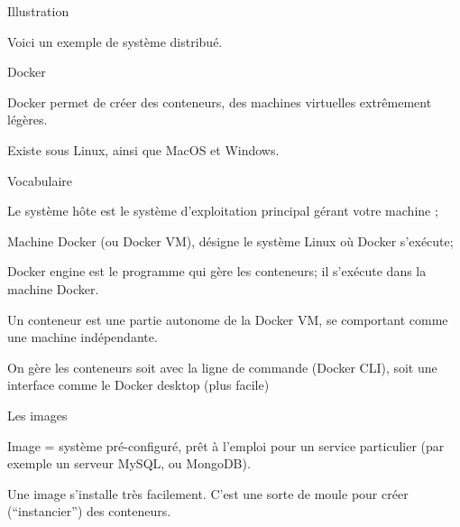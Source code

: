 \begin{frame}{Illustration}

Voici un exemple de système distribué.

\vfill


\end{frame}

\begin{frame}{Docker}

Docker permet de créer des \alert{conteneurs}, des machines virtuelles extrêmement légères.
\vfill


\vfill

Existe sous Linux, ainsi que MacOS et Windows.
\end{frame}


\begin{frame}{Vocabulaire}

\begin{redbullet}
  \item Le \alert{système hôte} est le système d'exploitation principal gérant votre machine ;
  \item  \alert{Machine Docker} (ou \alert{Docker VM}), désigne le système Linux où Docker s'exécute; 
  \item \alert{Docker engine} est le programme qui gère les conteneurs; il s'exécute
    dans la machine Docker.
  \item Un \alert{conteneur} est une partie autonome de la \alert{Docker VM}, se comportant comme une
    machine indépendante.
  \item On gère les conteneurs soit avec la ligne de commande (\alert{Docker CLI}), soit
 une interface comme le \alert{Docker desktop} (plus facile)
 \end{redbullet}


\end{frame}


\begin{frame}{Les images}

Image = système pré-configuré, prêt à l'emploi pour un service particulier (par exemple un serveur
MySQL, ou MongoDB).

\vfill


\vfill
Une image s'installe très facilement. C'est une sorte de moule pour créer
(``instancier'')  des conteneurs.

\end{frame}


